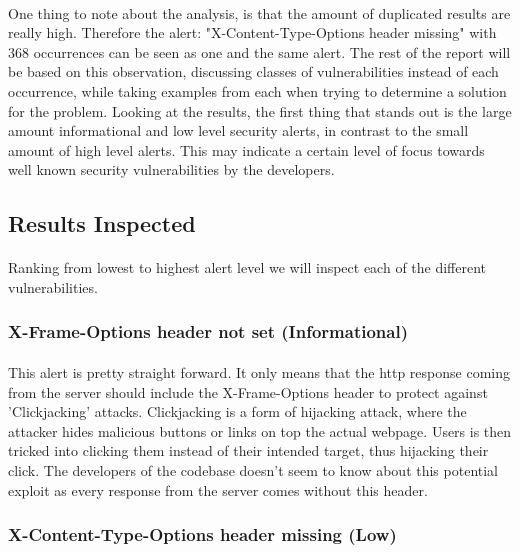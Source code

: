 \documentclass[11pt,english,a4paper]{report}
\begin{document}
\paragraph{}
One thing to note about the analysis, is that the amount of duplicated results are really high. 
Therefore the alert: "X-Content-Type-Options header missing" with 368 occurrences can be seen as one and the same alert. 
The rest of the report will be based on this observation, discussing classes of vulnerabilities instead of each occurrence, while taking examples from each when trying to determine a solution for the problem.
Looking at the results, the first thing that stands out is the large amount informational and low level security alerts, in contrast to the small amount of high level alerts.
This may indicate a certain level of focus towards well known security vulnerabilities by the developers.

\subsection{Results Inspected}
\paragraph{}
Ranking from lowest to highest alert level we will inspect each of the different vulnerabilities.

\subsubsection{X-Frame-Options header not set (Informational)}
\paragraph{}
This alert is pretty straight forward.
It only means that the \gls{http} response coming from the server should include the X-Frame-Options header to protect against 'Clickjacking'\cite{clickjacking} attacks.
Clickjacking is a form of hijacking attack, where the attacker hides malicious buttons or links on top the actual webpage.
Users is then tricked into clicking them instead of their intended target, thus hijacking their click.
The developers of the codebase doesn't seem to know about this potential exploit as every response from the server comes without this header.

\subsubsection{X-Content-Type-Options header missing (Low)}
\end{document}

